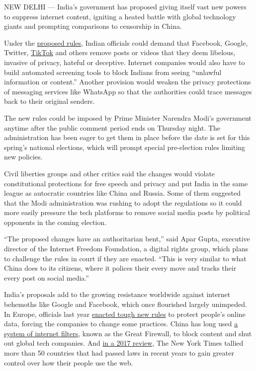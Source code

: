 NEW DELHI --- India's government has proposed giving itself vast new
powers to suppress internet content, igniting a heated battle with
global technology giants and prompting comparisons to censorship in
China.

Under the
\href{https://meity.gov.in/content/comments-suggestions-invited-draft-\%E2\%80\%9C-information-technology-intermediary-guidelines}{proposed
rules}, Indian officials could demand that Facebook, Google, Twitter,
\href{https://www.nytimes.com/2018/09/28/technology/bytedance-fundraising-toutiao-tiktok.html}{TikTok}
and others remove posts or videos that they deem libelous, invasive of
privacy, hateful or deceptive. Internet companies would also have to
build automated screening tools to block Indians from seeing ``unlawful
information or content.'' Another provision would weaken the privacy
protections of messaging services like WhatsApp so that the authorities
could trace messages back to their original senders.

The new rules could be imposed by Prime Minister Narendra Modi's
government anytime after the public comment period ends on Thursday
night. The administration has been eager to get them in place before the
date is set for this spring's national elections, which will prompt
special pre-election rules limiting new policies.

Civil liberties groups and other critics said the changes would violate
constitutional protections for free speech and privacy and put India in
the same league as autocratic countries like China and Russia. Some of
them suggested that the Modi administration was rushing to adopt the
regulations so it could more easily pressure the tech platforms to
remove social media posts by political opponents in the coming election.

``The proposed changes have an authoritarian bent,'' said Apar Gupta,
executive director of the Internet Freedom Foundation, a digital rights
group, which plans to challenge the rules in court if they are enacted.
``This is very similar to what China does to its citizens, where it
polices their every move and tracks their every post on social media.''

India's proposals add to the growing resistance worldwide against
internet behemoths like Google and Facebook, which once flourished
largely unimpeded. In Europe, officials last year
\href{https://www.nytimes.com/2018/05/24/technology/europe-gdpr-privacy.html}{enacted
tough new rules} to protect people's online data, forcing the companies
to change some practices. China has long used
\href{https://www.nytimes.com/interactive/2018/11/18/world/asia/china-internet.html}{a
system of internet filters}, known as the Great Firewall, to block
content and shut out global tech companies. And
\href{https://www.nytimes.com/2017/09/17/technology/facebook-government-regulations.html}{in
a 2017 review}, The New York Times tallied more than 50 countries that
had passed laws in recent years to gain greater control over how their
people use the web.


